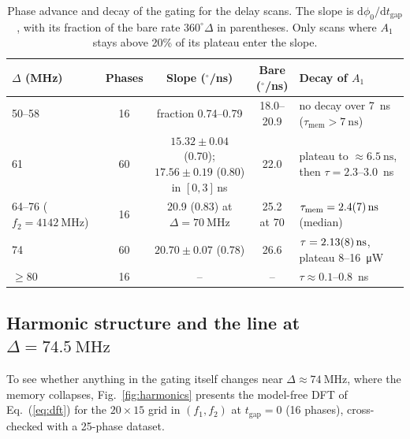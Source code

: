 \documentclass[aps,prb,reprint,superscriptaddress,floatfix]{revtex4-2}
\newcommand{\tgap}{t_{\mathrm{gap}}}
\begin{document}
\begin{table}
\caption{Phase advance and decay of the gating for the delay scans. The slope is $\mathrm{d}\phi_0/\mathrm{d}\tgap$, with its fraction of the bare rate $360^\circ\Delta$ in parentheses. Only scans where $A_1$ stays above 20\% of its plateau enter the slope.}
\label{tab:memory}
\begin{ruledtabular}
\begin{tabular}{lcccp{6.0cm}}
$\Delta$ (MHz) & Phases & Slope ($^\circ$/ns) & Bare ($^\circ$/ns) & Decay of $A_1$\\
\hline
50--58 & 16 & fraction 0.74--0.79 & 18.0--20.9 & no decay over \SI{7}{\nano\second} ($\tau_{\mathrm{mem}}>\SI{7}{\nano\second}$)\\
61 & 60 & $15.32\pm0.04$ (0.70); $17.56\pm0.19$ (0.80) in $[0,3]$\,ns & 22.0 & plateau to $\approx\SI{6.5}{\nano\second}$, then $\tau=2.3$--\SI{3.0}{\nano\second}\\
64--76 ($f_2=\SI{4142}{\mega\hertz}$) & 16 & 20.9 (0.83) at $\Delta=\SI{70}{\mega\hertz}$ & 25.2 at 70 & $\tau_{\mathrm{mem}}=\SI{2.4+-0.7}{\nano\second}$ (median)\\
74 & 60 & $20.70\pm0.07$ (0.78) & 26.6 & $\tau=\SI{2.13+-0.08}{\nano\second}$, plateau 8--\SI{16}{\micro\watt}\\
$\ge80$ & 16 & -- & -- & $\tau\approx0.1$--\SI{0.8}{\nano\second}\\
\end{tabular}
\end{ruledtabular}
\end{table}

\subsection{Harmonic structure and the line at $\Delta=\SI{74.5}{\mega\hertz}$}\label{sec:harm}

To see whether anything in the gating itself changes near $\Delta\approx\SI{74}{\mega\hertz}$, where the memory collapses, Fig.~\ref{fig:harmonics} presents the model-free DFT of Eq.~(\ref{eq:dft}) for the $20\times15$ grid in $(f_1,f_2)$ at $\tgap=0$ (16 phases), cross-checked with a 25-phase dataset.
\end{document}
